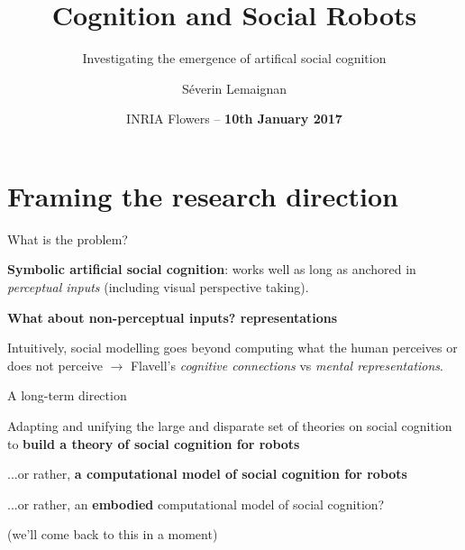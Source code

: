 \documentclass[compress]{beamer}
\title{Cognition and Social Robots}
\subtitle{Investigating the emergence of artifical social cognition}
\date{INRIA Flowers -- {\bf 10th January 2017}}
\author{Séverin Lemaignan}
\institute{Centre for Robotics and Neural Systems\\{\bf
Plymouth University}}
\begin{document}
\maketitle

\section{Framing the research direction}

 \begin{frame}{What is the problem?}

        {\bf Symbolic artificial social cognition}:
        works well as long as anchored in \emph{perceptual inputs} (including visual
        perspective taking).

        \pause

        {\bf What about non-perceptual inputs? \ie representations}

        Intuitively, social modelling goes beyond computing what the human
        perceives or does not perceive $\rightarrow$ Flavell's \emph{cognitive
        connections} vs \emph{mental representations}.

 \end{frame}

\begin{frame}{A long-term direction}

    Adapting and unifying the large and disparate set of theories on social
    cognition to {\bf build a theory of social cognition for
    robots}

    \pause
    ...or rather, {\bf a computational model of social cognition for robots}

    \pause

    ...or rather, an {\bf embodied} computational model of social cognition?

    \footnotesize (we'll come back to this in a moment)

\end{frame}
\end{document}

